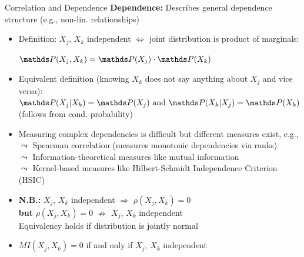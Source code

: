 \documentclass[11pt,compress,t,notes=noshow, aspectratio=169, xcolor=table]{beamer}
\begin{document}
\begin{frame}{Correlation and Dependence}
\textbf{Dependence:} Describes general dependence structure  (e.g., non-lin. relationships)

\begin{itemize}[<+->]
\item Definition: $X_j$, $X_k$ independent $\Leftrightarrow$ joint distribution is product of marginals:\\ \vspace{5pt}
\centerline{$\P(X_j, X_k) = \P(X_j) \cdot \P(X_k)$}
\vspace{5pt}
\item Equivalent definition (knowing $X_k$ does not say anything about $X_j$ and vice versa): \\
\vspace{5pt}
\phantom{AAA} $\P(X_j|X_k) = \P(X_j) \text{ and } \P(X_k|X_j) = \P(X_k)$ \hfill (follows from cond. probability) \phantom{AAA}
\vspace{5pt}
\item Measuring complex dependencies is difficult but different measures exist, e.g., \\
$\leadsto$ Spearman correlation (measures monotonic dependencies via ranks) \\
$\leadsto$ Information-theoretical measures like mutual information \\
$\leadsto$ Kernel-based measures like Hilbert-Schmidt Independence Criterion (HSIC)
\item \textbf{N.B.:} $X_j$, $X_k$ independent $\Rightarrow$ $\rho(X_j, X_k) = 0$ \\ \textbf{but} $\rho(X_j, X_k) = 0$ $\nRightarrow$ $X_j$, $X_k$  independent \\
Equivalency holds if distribution is jointly normal
\item  $MI(X_j, X_k) = 0$ if and only if $X_j$, $X_k$ independent
\end{itemize}
\end{frame}
\end{document}
